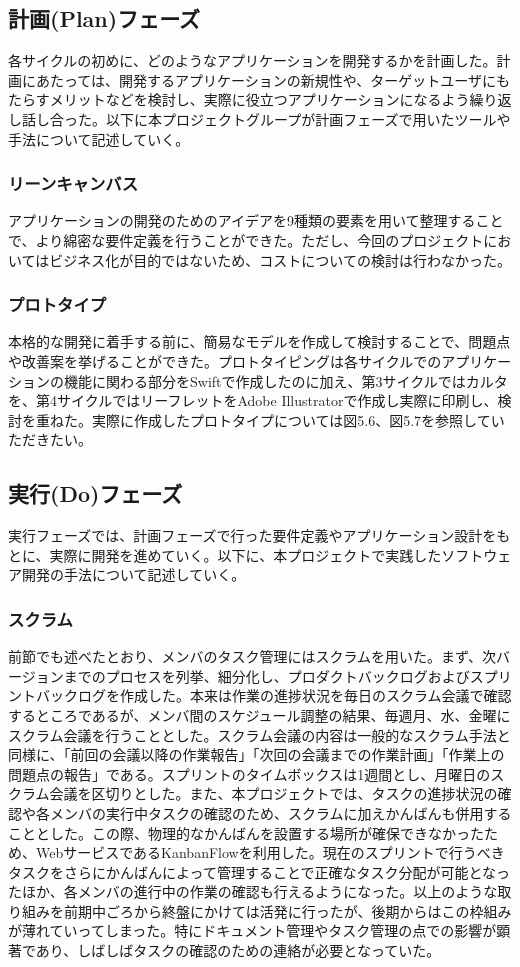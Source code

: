 \subsection{計画(Plan)フェーズ}
各サイクルの初めに、どのようなアプリケーションを開発するかを計画した。計画にあたっては、開発するアプリケーションの新規性や、ターゲットユーザにもたらすメリットなどを検討し、実際に役立つアプリケーションになるよう繰り返し話し合った。以下に本プロジェクトグループが計画フェーズで用いたツールや手法について記述していく。
\subsubsection{リーンキャンバス}
アプリケーションの開発のためのアイデアを9種類の要素を用いて整理することで、より綿密な要件定義を行うことができた。ただし、今回のプロジェクトにおいてはビジネス化が目的ではないため、コストについての検討は行わなかった。
\subsubsection{プロトタイプ}
本格的な開発に着手する前に、簡易なモデルを作成して検討することで、問題点や改善案を挙げることができた。プロトタイピングは各サイクルでのアプリケーションの機能に関わる部分をSwiftで作成したのに加え、第3サイクルではカルタを、第4サイクルではリーフレットをAdobe Illustratorで作成し実際に印刷し、検討を重ねた。実際に作成したプロトタイプについては図5.6、図5.7を参照していただきたい。
\subsection{実行(Do)フェーズ}
実行フェーズでは、計画フェーズで行った要件定義やアプリケーション設計をもとに、実際に開発を進めていく。以下に、本プロジェクトで実践したソフトウェア開発の手法について記述していく。
\subsubsection{スクラム}
前節でも述べたとおり、メンバのタスク管理にはスクラムを用いた。まず、次バージョンまでのプロセスを列挙、細分化し、プロダクトバックログおよびスプリントバックログを作成した。本来は作業の進捗状況を毎日のスクラム会議で確認するところであるが、メンバ間のスケジュール調整の結果、毎週月、水、金曜にスクラム会議を行うこととした。スクラム会議の内容は一般的なスクラム手法と同様に、「前回の会議以降の作業報告」「次回の会議までの作業計画」「作業上の問題点の報告」である。スプリントのタイムボックスは1週間とし、月曜日のスクラム会議を区切りとした。また、本プロジェクトでは、タスクの進捗状況の確認や各メンバの実行中タスクの確認のため、スクラムに加えかんばんも併用することとした。この際、物理的なかんばんを設置する場所が確保できなかったため、WebサービスであるKanbanFlowを利用した。現在のスプリントで行うべきタスクをさらにかんばんによって管理することで正確なタスク分配が可能となったほか、各メンバの進行中の作業の確認も行えるようになった。以上のような取り組みを前期中ごろから終盤にかけては活発に行ったが、後期からはこの枠組みが薄れていってしまった。特にドキュメント管理やタスク管理の点での影響が顕著であり、しばしばタスクの確認のための連絡が必要となっていた。
